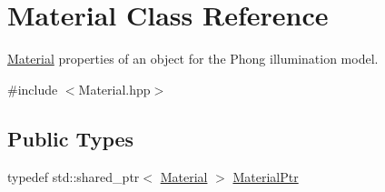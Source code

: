 \hypertarget{classMaterial}{\section{Material Class Reference}
\label{classMaterial}
}


\hyperlink{classMaterial}{Material} properties of an object for the Phong illumination model.  




{\ttfamily \#include $<$Material.\+hpp$>$}

\subsection*{Public Types}
\begin{DoxyCompactItemize}
\item 
typedef std\+::shared\+\_\+ptr$<$ \hyperlink{classMaterial}{Material} $>$ \hyperlink{classMaterial_afa8bf8c90cac7c65ba73bffc15f617c9}{Material\+Ptr}
\end{DoxyCompactItemize}
